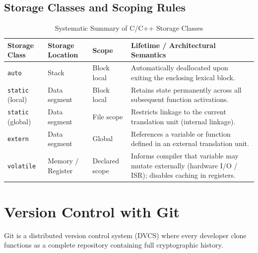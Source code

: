 \subsection{Storage Classes and Scoping Rules}
\begin{table}[htbp]
\centering
\small
\begin{tabularx}{\textwidth}{l l l X}
\toprule
\textbf{Storage Class} & \textbf{Storage Location} & \textbf{Scope} & \textbf{Lifetime / Architectural Semantics} \\
\midrule
\texttt{auto} & Stack & Block local & Automatically deallocated upon exiting the enclosing lexical block. \\
\texttt{static} (local) & Data segment & Block local & Retains state permanently across all subsequent function activations. \\
\texttt{static} (global) & Data segment & File scope & Restricts linkage to the current translation unit (internal linkage). \\
\texttt{extern} & Data segment & Global & References a variable or function defined in an external translation unit. \\
\texttt{volatile} & Memory / Register & Declared scope & Informs compiler that variable may mutate externally (hardware I/O / ISR); disables caching in registers. \\
\bottomrule
\end{tabularx}
\caption{Systematic Summary of C/C++ Storage Classes}
\label{tab:storage_classes}
\end{table}

\section{Version Control with Git}
\label{sec:version_control_git}

Git is a distributed version control system (DVCS) where every developer clone functions as a complete repository containing full cryptographic history.


